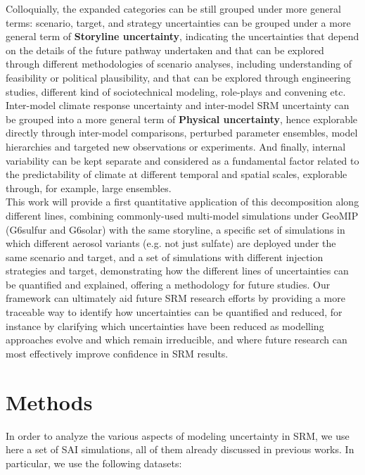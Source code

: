 \documentclass[draft]{agujournal2019}
\begin{document}
Colloquially, the expanded categories can be still grouped under more general terms: scenario, target, and strategy uncertainties can be grouped under a more general term of \textbf{Storyline uncertainty}, indicating the uncertainties that depend on the details of the future pathway undertaken and that can be explored through different methodologies of scenario analyses, including understanding of feasibility or political plausibility, and that can be explored through engineering studies, different kind of sociotechnical modeling, role-plays and convening etc. Inter-model climate response uncertainty and inter-model SRM uncertainty can be grouped into a more general term of \textbf{Physical uncertainty}, hence explorable directly through inter-model comparisons, perturbed parameter ensembles, model hierarchies and targeted new observations or experiments. And finally, internal variability can be kept separate and considered as a fundamental factor related to the predictability of climate at different temporal and spatial scales, explorable through, for example, large ensembles. \\

This work will provide a first quantitative application of this decomposition along different lines, combining commonly-used multi-model simulations under GeoMIP (G6sulfur and G6solar) with the same storyline, a specific set of simulations in which different aerosol variants (e.g. not just sulfate) are deployed under the same scenario and target, and a set of simulations with different injection strategies and target, demonstrating how the different lines of uncertainties can be quantified and explained, offering a methodology for future studies. Our framework can ultimately aid future SRM research efforts by providing a more traceable way to identify how uncertainties can be quantified and reduced, for instance by clarifying which uncertainties have been reduced as modelling approaches evolve and which remain irreducible, and where future research can most effectively improve confidence in SRM results. %


\section{Methods}

In order to analyze the various aspects of modeling uncertainty in SRM, we use here a set of SAI simulations, all of them already discussed in previous works. In particular, we use the following datasets:
\end{document}
